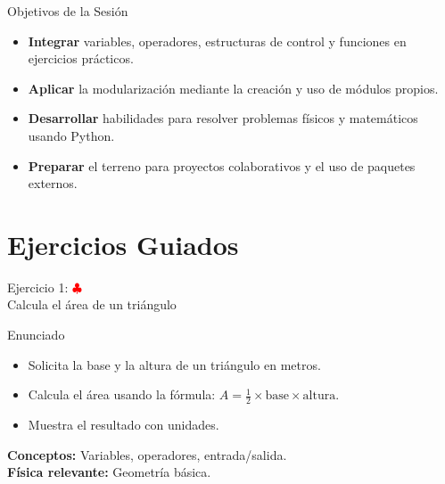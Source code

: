 \documentclass[10pt]{beamer}
\begin{document}
\begin{frame}{Objetivos de la Sesión}
  \begin{itemize}
    \item \textbf{Integrar} variables, operadores, estructuras de control y funciones en ejercicios prácticos.
    \item \textbf{Aplicar} la modularización mediante la creación y uso de módulos propios.
    \item \textbf{Desarrollar} habilidades para resolver problemas físicos y matemáticos usando Python.
    \item \textbf{Preparar} el terreno para proyectos colaborativos y el uso de paquetes externos.
  \end{itemize}
\end{frame}



\section{Ejercicios Guiados}

\begin{frame}{Ejercicio 1: \hfill \textcolor{red}{$\clubsuit$} \\ Calcula el área de un triángulo}
  \begin{block}{Enunciado}
    \begin{itemize}
      \item Solicita la base y la altura de un triángulo en metros.
      \item Calcula el área usando la fórmula: \(A = \frac{1}{2} \times \text{base} \times \text{altura}\).
      \item Muestra el resultado con unidades.
    \end{itemize}
  \end{block}
  \textbf{Conceptos:} Variables, operadores, entrada/salida.\\
  \textbf{Física relevante:} Geometría básica.
\end{frame}
\end{document}
